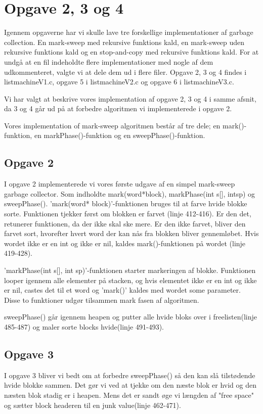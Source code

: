 \section{Opgave 2, 3 og 4}
\label{O2}
Igennem opgaverne har vi skulle lave tre forskellige implementationer af garbage collection. En mark-sweep med rekursive funktions kald, en mark-sweep uden rekursive funktions kald og en stop-and-copy med rekursive funktions kald. For at undgå at en fil indeholdte flere implementationer med nogle af dem udkommenteret, valgte vi at dele dem ud i flere filer. Opgave 2, 3 og 4 findes i listmachineV1.c, opgave 5 i listmachineV2.c og opgave 6 i listmachineV3.c.

Vi har valgt at beskrive vores implementation af opgave 2, 3 og 4 i samme afsnit, da 3 og 4 går ud på at forbedre algoritmen vi implementerede i opgave 2.

Vores implementation of mark-sweep algoritmen består af tre dele; en mark()-funktion, en markPhase()-funktion og en sweepPhase()-funktion. 

\subsection{Opgave 2}
\label{O2_2}
I opgave 2 implementerede vi vores første udgave af en simpel mark-sweep garbage collector. Som indholdte mark(word*block), markPhase(int s[], intsp) og sweepPhase().
'mark(word* block)'-funktionen bruges til at farve hvide blokke sorte. Funktionen tjekker først om blokken er farvet (linje 412-416). Er den det, retunerer funktionen, da der ikke skal ske mere. Er den ikke farvet, bliver den farvet sort, hvorefter hvert word der kan nås fra blokken bliver gennemløbet. Hvis wordet ikke er en int og ikke er nil, kaldes mark()-funktionen på wordet (linje 419-428).

'markPhase(int s[], int sp)'-funktionen starter markeringen af blokke. Funktionen looper igennem alle elementer på stacken, og hvis elementet ikke er en int og ikke er nil, castes det til et word og 'mark()' kaldes med wordet some parameter. Disse to funktioner udgør tilsammen mark fasen af algoritmen.

sweepPhase() går igennem heapen og putter alle hvide bloks over i freelisten(linje 485-487) og maler sorte blocks hvide(linje 491-493).

\subsection{Opgave 3}
\label{O2_3}
I opgave 3 bliver vi bedt om at forbedre sweepPhase() så den kan slå tilstødende hvide blokke sammen. Det gør vi ved at tjekke om den næste blok er hvid og den næsten blok stadig er i heapen. Mens det er sandt øge vi længden af "free space"  og sætter block headeren til en junk value(linje 462-471).
 
